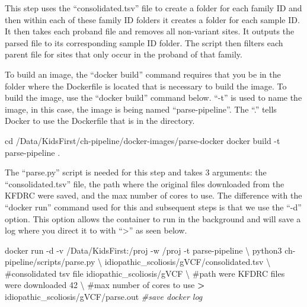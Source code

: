 \documentclass[]{article}
\newenvironment{Shaded}{\begin{snugshade}}{\end{snugshade}}
\newcommand{\BuiltInTok}[1]{#1}
\newcommand{\CommentTok}[1]{\textcolor[rgb]{0.56,0.35,0.01}{\textit{#1}}}
\newcommand{\DataTypeTok}[1]{\textcolor[rgb]{0.13,0.29,0.53}{#1}}
\newcommand{\ExtensionTok}[1]{#1}
\newcommand{\NormalTok}[1]{#1}
\newcommand{\OperatorTok}[1]{\textcolor[rgb]{0.81,0.36,0.00}{\textbf{#1}}}
\begin{document}
This step uses the ``consolidated.tsv'' file to create a folder for each
family ID and then within each of these family ID folders it creates a
folder for each sample ID. It then takes each proband file and removes
all non-variant sites. It outputs the parsed file to its corresponding
sample ID folder. The script then filters each parent file for sites
that only occur in the proband of that family.

To build an image, the ``docker build'' command requires that you be in
the folder where the Dockerfile is located that is necessary to build
the image. To build the image, use the ``docker build'' command below.
``-t'' is used to name the image, in this case, the image is being named
``parse-pipeline''. The ``.'' tells Docker to use the Dockerfile that is
in the directory.

\begin{Shaded}
\begin{Highlighting}[]
\BuiltInTok{cd}\NormalTok{ /Data/KidsFirst/ch-pipeline/docker-images/parse-docker}
\ExtensionTok{docker}\NormalTok{ build -t parse-pipeline .}
\end{Highlighting}
\end{Shaded}

The ``parse.py'' script is needed for this step and takes 3 arguments:
the ``consolidated.tsv'' file, the path where the original files
downloaded from the KFDRC were saved, and the max number of cores to
use. The difference with the ``docker run'' command used for this and
subsequent steps is that we use the ``-d'' option. This option allows
the container to run in the background and will save a log where you
direct it to with ``\textgreater{}'' as seen below.

\begin{Shaded}
\begin{Highlighting}[]
\ExtensionTok{docker}\NormalTok{ run -d -v /Data/KidsFirst:/proj -w /proj -t parse-pipeline \textbackslash{}}
\NormalTok{  python3 ch-pipeline/scripts/parse.py \textbackslash{}}
\NormalTok{  idiopathic_scoliosis/gVCF/consolidated.tsv }\DataTypeTok{\textbackslash{} }\NormalTok{#consolidated tsv file}
  \ExtensionTok{idiopathic_scoliosis/gVCF} \DataTypeTok{\textbackslash{} }\NormalTok{#path were KFDRC files were downloaded}
  \ExtensionTok{42} \DataTypeTok{\textbackslash{} }\NormalTok{#max number of cores to use}
  \OperatorTok{>} \ExtensionTok{idiopathic_scoliosis/gVCF/parse.out} \CommentTok{#save docker log}
\end{Highlighting}
\end{Shaded}
\end{document}
